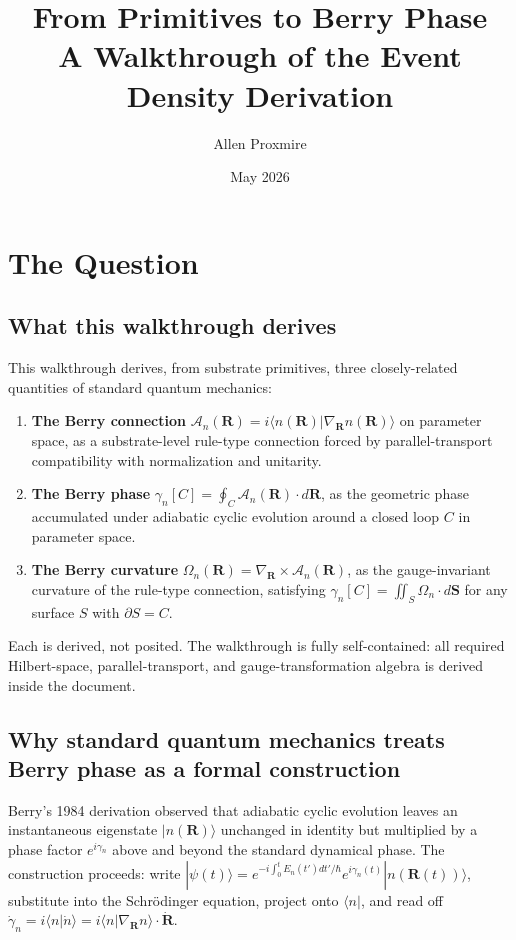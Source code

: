 \documentclass[11pt,a4paper]{article}
\title{\vspace{-1cm}\Large\bfseries From Primitives to Berry Phase\\[6pt]
\large\mdseries A Walkthrough of the Event Density Derivation}
\author{Allen Proxmire}
\date{May 2026}
\begin{document}
\maketitle
\thispagestyle{empty}

\section{The Question}

\subsection*{What this walkthrough derives}

This walkthrough derives, from substrate primitives, three closely-related quantities of standard quantum mechanics:

\begin{enumerate}[noitemsep]
  \item \textbf{The Berry connection} $\mathcal{A}_n(\mathbf{R}) = i\langle n(\mathbf{R})|\nabla_\mathbf{R} n(\mathbf{R})\rangle$ on parameter space, as a substrate-level rule-type connection forced by parallel-transport compatibility with normalization and unitarity.
  \item \textbf{The Berry phase} $\gamma_n[C] = \oint_C \mathcal{A}_n(\mathbf{R})\cdot d\mathbf{R}$, as the geometric phase accumulated under adiabatic cyclic evolution around a closed loop $C$ in parameter space.
  \item \textbf{The Berry curvature} $\Omega_n(\mathbf{R}) = \nabla_\mathbf{R}\times\mathcal{A}_n(\mathbf{R})$, as the gauge-invariant curvature of the rule-type connection, satisfying $\gamma_n[C] = \iint_S \Omega_n\cdot d\mathbf{S}$ for any surface $S$ with $\partial S = C$.
\end{enumerate}

Each is derived, not posited. The walkthrough is fully self-contained: all required Hilbert-space, parallel-transport, and gauge-transformation algebra is derived inside the document.

\subsection*{Why standard quantum mechanics treats Berry phase as a formal construction}

Berry's 1984 derivation observed that adiabatic cyclic evolution leaves an instantaneous eigenstate $|n(\mathbf{R})\rangle$ unchanged in identity but multiplied by a phase factor $e^{i\gamma_n}$ above and beyond the standard dynamical phase. The construction proceeds: write $|\psi(t)\rangle = e^{-i\int_0^t E_n(t')dt'/\hbar} e^{i\gamma_n(t)}|n(\mathbf{R}(t))\rangle$, substitute into the Schr\"odinger equation, project onto $\langle n|$, and read off $\dot\gamma_n = i\langle n|\dot n\rangle = i\langle n|\nabla_\mathbf{R} n\rangle\cdot\dot{\mathbf{R}}$.
\end{document}
